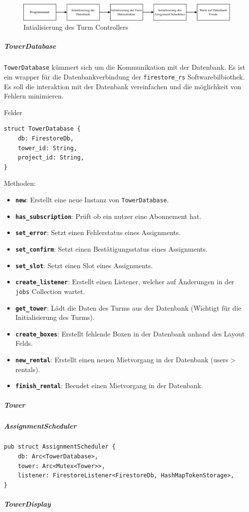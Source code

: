 \begin{figure}[ht]
  \centering
  \includegraphics[width=1\textwidth]{images/tower_controller_v4_init.png}
  \caption{Intialisierung des Turm Controllers}
  \label{fig:tower_controller_v4_init}
\end{figure}

\subparagraph{{TowerDatabase}}

\texttt{TowerDatabase} kümmert sich um die Kommunikation mit der Datenbank. Es ist ein \Gls{wrapper} für die Datenbankverbindung der \texttt{firestore\_rs} Softwarebilbiothek. Es soll die interaktion mit der Datenbank vereinfachen und die möglichkeit von Fehlern minimieren.

Felder
\begin{verbatim}
struct TowerDatabase {
    db: FirestoreDb,
    tower_id: String,
    project_id: String,
}
\end{verbatim}

Methoden:
\begin{itemize}
  \item \textbf{\texttt{new}}: Erstellt eine neue Instanz von \texttt{TowerDatabase}.
  \item \textbf{\texttt{has\_subscription}}: Prüft ob ein nutzer eine Abonnement hat.
  \item \textbf{\texttt{set\_error}}: Setzt einen Fehlerstatus eines Assignments.
  \item \textbf{\texttt{set\_confirm}}: Setzt einen Bestätigungsstatus eines Assignments.
  \item \textbf{\texttt{set\_slot}}: Setzt einen Slot eines Assignments.
  \item \textbf{\texttt{create\_listener}}: Erstellt einen Listener, welcher auf Änderungen in der \texttt{jobs} Collection wartet.
  \item \textbf{\texttt{get\_tower}}: Lädt die Daten des Turms aus der Datenbank (Wichtigt für die Initialisierung des Turms).
  \item \textbf{\texttt{create\_boxes}}: Erstellt fehlende Boxen in der Datenbank anhand des Layout Felds.
  \item \textbf{\texttt{new\_rental}}: Erstellt einen neuen Mietvorgang in der Datenbank (users > rentals).
  \item \textbf{\texttt{finish\_rental}}: Beendet einen Mietvorgang in der Datenbank.
\end{itemize}


\subparagraph{Tower}

\subparagraph{AssignmentScheduler}
\begin{verbatim}
pub struct AssignmentScheduler {
    db: Arc<TowerDatabase>,
    tower: Arc<Mutex<Tower>>,
    listener: FirestoreListener<FirestoreDb, HashMapTokenStorage>,
}
\end{verbatim}


\subparagraph{TowerDisplay}
